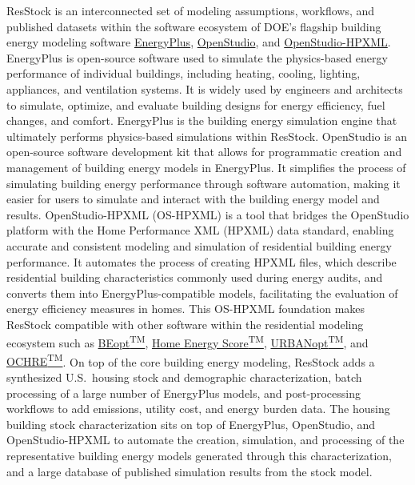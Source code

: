 ResStock is an interconnected set of modeling assumptions, workflows, and published datasets within the software ecosystem of DOE's flagship building energy modeling software \href{https://energyplus.net/}{EnergyPlus}, \href{https://openstudio.net/}{OpenStudio}, and \href{https://openstudio-hpxml.readthedocs.io/en/v1.8.1/}{OpenStudio-HPXML}. EnergyPlus is open-source software used to simulate the physics-based energy performance of individual buildings, including heating, cooling, lighting, appliances, and ventilation systems. It is widely used by engineers and architects to simulate, optimize, and evaluate building designs for energy efficiency, fuel changes, and comfort. EnergyPlus is the building energy simulation engine that ultimately performs physics-based simulations within ResStock. OpenStudio is an open-source software development kit that allows for programmatic creation and management of building energy models in EnergyPlus. It simplifies the process of simulating building energy performance through software automation, making it easier for users to simulate and interact with the building energy model and results. OpenStudio-HPXML (OS-HPXML) is a tool that bridges the OpenStudio platform with the Home Performance XML (HPXML) data standard, enabling accurate and consistent modeling and simulation of residential building energy performance. It automates the process of creating HPXML files, which describe residential building characteristics commonly used during energy audits, and converts them into EnergyPlus-compatible models, facilitating the evaluation of energy efficiency measures in homes. This OS-HPXML foundation makes ResStock compatible with other software within the residential modeling ecosystem such as \href{https://www.nrel.gov/buildings/beopt.html}{BEopt\textsuperscript{TM}}, \href{https://www.energy.gov/eere/buildings/articles/home-energy-score}{Home Energy Score\textsuperscript{TM}}, \href{https://docs.urbanopt.net/}{URBANopt\textsuperscript{TM}}, and \href{https://github.com/NREL/OCHRE}{OCHRE\textsuperscript{TM}}. On top of the core building energy modeling, ResStock adds a synthesized U.S.~housing stock and demographic characterization, batch processing of a large number of EnergyPlus models, and post-processing workflows to add emissions, utility cost, and energy burden data. The housing building stock characterization sits on top of EnergyPlus, OpenStudio, and OpenStudio-HPXML to automate the creation, simulation, and processing of the representative building energy models generated through this characterization, and a large database of published simulation results from the stock model. 


